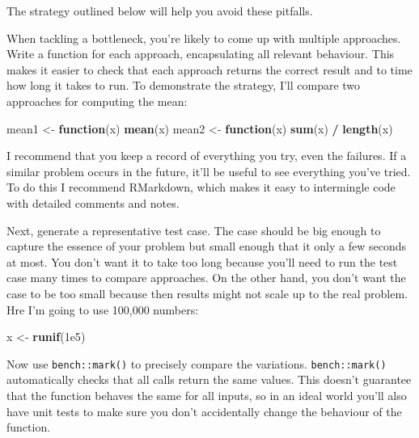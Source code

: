 \documentclass[]{book}
\newenvironment{Shaded}{\begin{snugshade}}{\end{snugshade}}
\newcommand{\ControlFlowTok}[1]{\textcolor[rgb]{0.27,0.27,0.27}{\textbf{#1}}}
\newcommand{\FloatTok}[1]{\textcolor[rgb]{0.06,0.06,0.06}{#1}}
\newcommand{\KeywordTok}[1]{\textcolor[rgb]{0.27,0.27,0.27}{\textbf{#1}}}
\newcommand{\NormalTok}[1]{#1}
\newcommand{\OperatorTok}[1]{\textcolor[rgb]{0.43,0.43,0.43}{\textbf{#1}}}
\newcommand{\StringTok}[1]{\textcolor[rgb]{0.5,0.5,0.5}{#1}}
\begin{document}
The strategy outlined below will help you avoid these pitfalls.

When tackling a bottleneck, you're likely to come up with multiple approaches. Write a function for each approach, encapsulating all relevant behaviour. This makes it easier to check that each approach returns the correct result and to time how long it takes to run. To demonstrate the strategy, I'll compare two approaches for computing the mean:

\begin{Shaded}
\begin{Highlighting}[]
\NormalTok{mean1 <-}\StringTok{ }\ControlFlowTok{function}\NormalTok{(x) }\KeywordTok{mean}\NormalTok{(x)}
\NormalTok{mean2 <-}\StringTok{ }\ControlFlowTok{function}\NormalTok{(x) }\KeywordTok{sum}\NormalTok{(x) }\OperatorTok{/}\StringTok{ }\KeywordTok{length}\NormalTok{(x)}
\end{Highlighting}
\end{Shaded}

I recommend that you keep a record of everything you try, even the failures. If a similar problem occurs in the future, it'll be useful to see everything you've tried. To do this I recommend RMarkdown, which makes it easy to intermingle code with detailed comments and notes.

Next, generate a representative test case. The case should be big enough to capture the essence of your problem but small enough that it only a few seconds at most. You don't want it to take too long because you'll need to run the test case many times to compare approaches. On the other hand, you don't want the case to be too small because then results might not scale up to the real problem. Hre I'm going to use 100,000 numbers:

\begin{Shaded}
\begin{Highlighting}[]
\NormalTok{x <-}\StringTok{ }\KeywordTok{runif}\NormalTok{(}\FloatTok{1e5}\NormalTok{)}
\end{Highlighting}
\end{Shaded}

Now use \texttt{bench::mark()} to precisely compare the variations. \texttt{bench::mark()} automatically checks that all calls return the same values. This doesn't guarantee that the function behaves the same for all inputs, so in an ideal world you'll also have unit tests to make sure you don't accidentally change the behaviour of the function.
\end{document}
